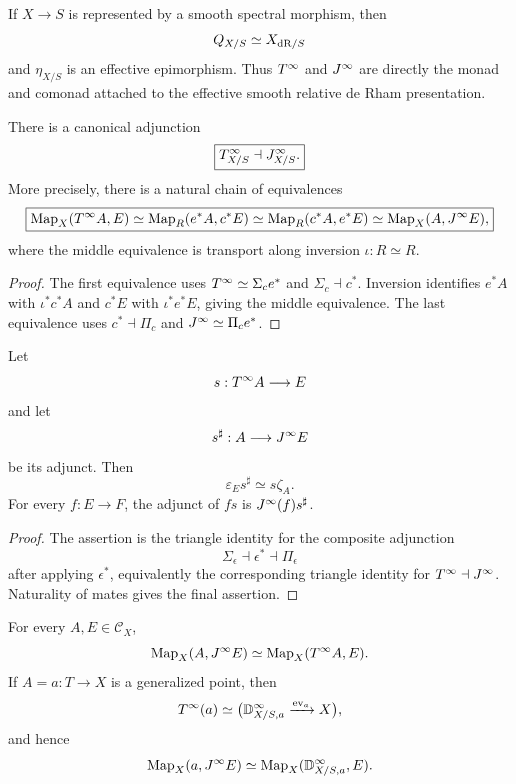 \begin{corollary}
\label{cor:jet-smooth-dR}
If $X\to S$ is represented by a smooth spectral morphism, then
\[
    Q_{X/S}\simeq X_{\mathrm{dR}/S}
\]
and $\eta_{X/S}$ is an effective epimorphism.  Thus $T^{\infty}$ and $J^{\infty}$ are directly the monad and comonad attached to the effective smooth relative de Rham presentation.
\end{corollary}

\begin{theorem}
\label{thm:disk-jet-adjunction}
There is a canonical adjunction
\[
    \boxed{T^{\infty}_{X/S}\dashv J^{\infty}_{X/S}.}
\]
More precisely, there is a natural chain of equivalences
\[
\boxed{
\operatorname{Map}_X(T^{\infty} A,E)
\simeq
\operatorname{Map}_R(e^*A,c^*E)
\simeq
\operatorname{Map}_R(c^*A,e^*E)
\simeq
\operatorname{Map}_X(A,J^{\infty} E),
}
\]
where the middle equivalence is transport along inversion $\iota:R\simeq R$.
\end{theorem}

\begin{proof}
The first equivalence uses $T^{\infty}\simeq\Sigma_ce^*$ and $\Sigma_c\dashv c^*$.  Inversion identifies $e^*A$ with $\iota^*c^*A$ and $c^*E$ with $\iota^*e^*E$, giving the middle equivalence.  The last equivalence uses $c^*\dashv\Pi_c$ and $J^{\infty}\simeq\Pi_ce^*$.
\end{proof}

\begin{lemma}
\label{lem:disk-jet-mate}
Let
\[
    s:T^{\infty} A\longrightarrow E
\]
and let
\[
    s^\sharp:A\longrightarrow J^{\infty} E
\]
be its adjunct.  Then
\[
    \boxed{\varepsilon_Es^\sharp\simeq s\zeta_A.}
\]
For every $f:E\to F$, the adjunct of $fs$ is $J^{\infty}(f)s^\sharp$.
\end{lemma}

\begin{proof}
The assertion is the triangle identity for the composite adjunction
\[
    \Sigma_\epsilon\dashv\epsilon^*\dashv\Pi_\epsilon
\]
after applying $\epsilon^*$, equivalently the corresponding triangle identity for $T^{\infty}\dashv J^{\infty}$.  Naturality of mates gives the final assertion.
\end{proof}

\begin{proposition}
\label{cor:jet-sections-formal-disks}
For every $A,E\in\mathcal C_X$,
\[
    \operatorname{Map}_X(A,J^{\infty} E)
    \simeq
    \operatorname{Map}_X(T^{\infty} A,E).
\]
If $A=a:T\to X$ is a generalized point, then
\[
    T^{\infty}(a)
    \simeq
    \bigl(
    \mathbb D^\infty_{X/S,a}
    \xrightarrow{\operatorname{ev}_a}
    X
    \bigr),
\]
and hence
\[
    \operatorname{Map}_X(a,J^{\infty} E)
    \simeq
    \operatorname{Map}_X(\mathbb D^\infty_{X/S,a},E).
\]
\end{proposition}

